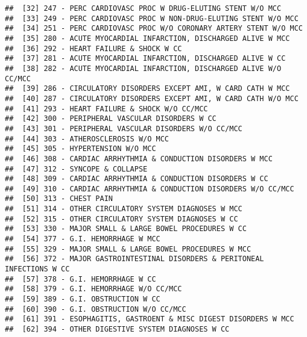 \documentclass[]{article}
\begin{document}
\begin{verbatim}
##  [32] 247 - PERC CARDIOVASC PROC W DRUG-ELUTING STENT W/O MCC                   
##  [33] 249 - PERC CARDIOVASC PROC W NON-DRUG-ELUTING STENT W/O MCC               
##  [34] 251 - PERC CARDIOVASC PROC W/O CORONARY ARTERY STENT W/O MCC              
##  [35] 280 - ACUTE MYOCARDIAL INFARCTION, DISCHARGED ALIVE W MCC                 
##  [36] 292 - HEART FAILURE & SHOCK W CC                                          
##  [37] 281 - ACUTE MYOCARDIAL INFARCTION, DISCHARGED ALIVE W CC                  
##  [38] 282 - ACUTE MYOCARDIAL INFARCTION, DISCHARGED ALIVE W/O CC/MCC            
##  [39] 286 - CIRCULATORY DISORDERS EXCEPT AMI, W CARD CATH W MCC                 
##  [40] 287 - CIRCULATORY DISORDERS EXCEPT AMI, W CARD CATH W/O MCC               
##  [41] 293 - HEART FAILURE & SHOCK W/O CC/MCC                                    
##  [42] 300 - PERIPHERAL VASCULAR DISORDERS W CC                                  
##  [43] 301 - PERIPHERAL VASCULAR DISORDERS W/O CC/MCC                            
##  [44] 303 - ATHEROSCLEROSIS W/O MCC                                             
##  [45] 305 - HYPERTENSION W/O MCC                                                
##  [46] 308 - CARDIAC ARRHYTHMIA & CONDUCTION DISORDERS W MCC                     
##  [47] 312 - SYNCOPE & COLLAPSE                                                  
##  [48] 309 - CARDIAC ARRHYTHMIA & CONDUCTION DISORDERS W CC                      
##  [49] 310 - CARDIAC ARRHYTHMIA & CONDUCTION DISORDERS W/O CC/MCC                
##  [50] 313 - CHEST PAIN                                                          
##  [51] 314 - OTHER CIRCULATORY SYSTEM DIAGNOSES W MCC                            
##  [52] 315 - OTHER CIRCULATORY SYSTEM DIAGNOSES W CC                             
##  [53] 330 - MAJOR SMALL & LARGE BOWEL PROCEDURES W CC                           
##  [54] 377 - G.I. HEMORRHAGE W MCC                                               
##  [55] 329 - MAJOR SMALL & LARGE BOWEL PROCEDURES W MCC                          
##  [56] 372 - MAJOR GASTROINTESTINAL DISORDERS & PERITONEAL INFECTIONS W CC       
##  [57] 378 - G.I. HEMORRHAGE W CC                                                
##  [58] 379 - G.I. HEMORRHAGE W/O CC/MCC                                          
##  [59] 389 - G.I. OBSTRUCTION W CC                                               
##  [60] 390 - G.I. OBSTRUCTION W/O CC/MCC                                         
##  [61] 391 - ESOPHAGITIS, GASTROENT & MISC DIGEST DISORDERS W MCC                
##  [62] 394 - OTHER DIGESTIVE SYSTEM DIAGNOSES W CC                               

\end{verbatim}
\end{document}
